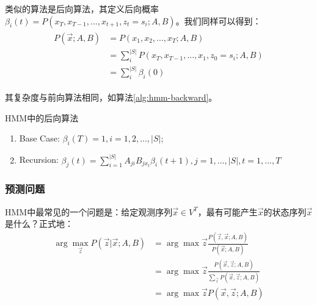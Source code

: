 类似的算法是后向算法，其定义后向概率$\beta_{i}(t)=P(x_T,x_{T-1},...,x_{t+1},z_t=s_i;A,B)$。我们同样可以得到：
\begin{align}
\label{eqn:hmm-likelihood2}
\begin{split}
  P(\vec{x};A,B) &= P(x_1,x_2,...,x_T;A,B) \\
                 &= \sum_{i}^{|S|} P(x_T,x_{T-1},...,x_1,z_0=s_i;A,B) \\
                 &= \sum_{i}^{|S|} \beta_{i}(0)
\end{split}
\end{align}

其复杂度与前向算法相同，如算法\ref{alg:hmm-backward}。
\begin{algorithm}
\caption{HMM中的后向算法} 
\label{alg:hmm-backward}
\begin{enumerate}
  \item Base Case: $\beta_{i}(T) = 1, i=1,2,...,|S|$;
  \item Recursion: $\beta_{j}(t) = \sum_{i=1}^{|S|} A_{ji}B_{jx_{t}}\beta_{i}(t+1), j = 1,...,|S|, t=1,...,T$
\end{enumerate}
\end{algorithm}

\subsubsection{预测问题}
HMM中最常见的一个问题是：给定观测序列$\vec{x}\in{V^{T}}$，最有可能产生$\vec{x}$的状态序列$\vec{x}$是什么？正式地：
\begin{align}
\arg\mathop{\max}_{\vec{z}} P(\vec{z}|\vec{x};A,B) 
&= \arg\mathop{\max}{\vec{z}} \frac{P(\vec{z},\vec{x};A,B)}{P(\vec{x};A,B)} \label{eqn:hmm-decode-1}\\
&= \arg\mathop{\max}{\vec{z}} \frac{P(\vec{x}, \vec{z};A,B)}{ \sum_{\vec{z}} P(\vec{x}, \vec{z};A,B)}  \label{eqn:hmm-decode-2} \\
&= \arg\mathop{\max}{\vec{z}} P(\vec{x}, \vec{z};A,B) \label{eqn:hmm-decode-3}
\end{align}

